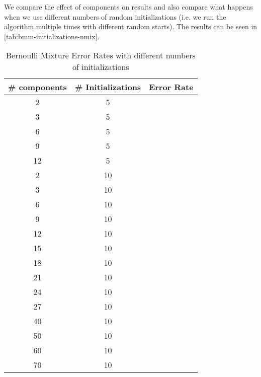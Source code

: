 \documentclass{article}
\begin{document}
We compare the effect of components on results and also compare what happens
when we use different numbers of random initializations (i.e. we run the algorithm
multiple times with different random starts). The results
can be seen in \autoref{tab:bmm-initializations-nmix}.
\begin{table}[h]
  \centering
  \begin{tabular}{| c | c |  c |}
    \hline
     \# components & \# Initializations  & Error Rate \\ \hline\hline
     2 & 5 &  \\
     \hline
     3 & 5 &  \\
     \hline
     6 & 5 &  \\
     \hline
     9 & 5 &   \\
     12 & 5 &   \\
     \hline
     2 & 10 &  \\
     \hline
     3 & 10 &  \\
     \hline
     6 & 10 &  \\
     \hline
     9 & 10 &   \\
     12 & 10 &   \\
     \hline
     15 & 10 &  \\
     \hline
     18 & 10 &   \\
     21 & 10 &   \\
     \hline
     24 & 10 &   \\
     \hline
     27 & 10 &   \\
     \hline
     40 & 10 &   \\
     \hline
     50 & 10 &   \\
     \hline
     60 & 10 &   \\
     \hline
     70 & 10 &   \\
     \hline
  \end{tabular}
  \caption{Bernoulli Mixture Error Rates with different numbers of initializations}
  \label{tab:bmm-initializations-nmix}
\end{table}
\end{document}

